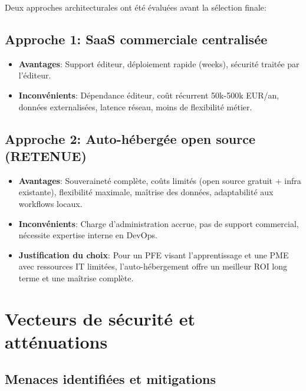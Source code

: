 Deux approches architecturales ont été évaluées avant la sélection finale:

\subsection{Approche 1: SaaS commerciale centralisée}
\begin{itemize}
	\item \textbf{Avantages}: Support éditeur, déploiement rapide (weeks), sécurité traitée par l'éditeur.
	\item \textbf{Inconvénients}: Dépendance éditeur, coût récurrent 50k-500k EUR/an, données externalisées, latence réseau, moins de flexibilité métier.
\end{itemize}

\subsection{Approche 2: Auto-hébergée open source (RETENUE)}
\begin{itemize}
	\item \textbf{Avantages}: Souveraineté complète, coûts limités (open source gratuit + infra existante), flexibilité maximale, maîtrise des données, adaptabilité aux workflows locaux.
	\item \textbf{Inconvénients}: Charge d'administration accrue, pas de support commercial, nécessite expertise interne en DevOps.
	\item \textbf{Justification du choix}: Pour un PFE visant l'apprentissage et une PME avec ressources IT limitées, l'auto-hébergement offre un meilleur ROI long terme et une maîtrise complète.
\end{itemize}

\section{Vecteurs de sécurité et atténuations}

\subsection{Menaces identifiées et mitigations}

